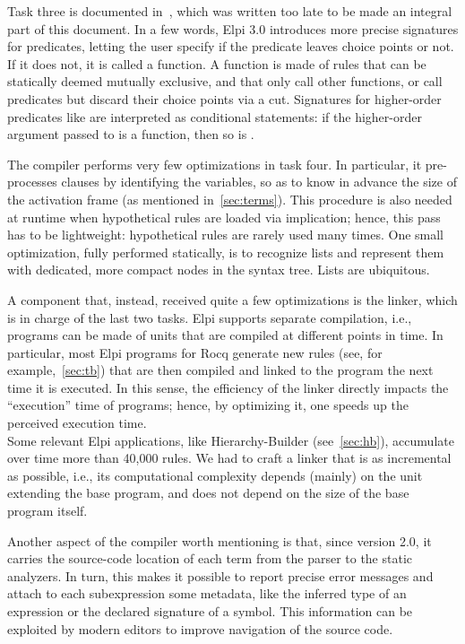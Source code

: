 \documentclass[a4paper, 11pt]{book}
\begin{document}
Task three is documented in~\cite{elpidet}, which was written too late to be
made an integral part of this document. In a few words, Elpi 3.0 introduces
more precise signatures for predicates, letting the user specify if the
predicate leaves choice points or not. If it does not, it is called a function.
A function is made of rules that can be statically deemed mutually exclusive,
and that only call other functions, or call predicates but discard their choice
points via a cut. Signatures for higher-order predicates like  are
interpreted as conditional statements: if the higher-order argument 
passed to  is a function, then so is .


The compiler performs very few optimizations in task four. In particular, it
pre-processes clauses by identifying the variables, so as to know in advance
the size of the activation frame (as mentioned in~\cref{sec:terms}). This
procedure is also needed at runtime when hypothetical rules are loaded via
implication; hence, this pass has to be lightweight: hypothetical rules are
rarely used many times. One small optimization, fully performed statically, is
to recognize lists and represent them with dedicated, more compact nodes in
the syntax tree. Lists are ubiquitous.


A component that, instead, received quite a few optimizations is the linker,
which is in charge of the last two tasks. Elpi supports separate compilation,
i.e., programs can be made of units that are compiled at different points in
time. In particular, most Elpi programs for Rocq generate new rules (see, for
example,~\cref{sec:tb}) that are then compiled and linked to the program the
next time it is executed. In this sense, the efficiency of the linker directly
impacts the ``execution'' time of programs; hence, by optimizing it, one speeds
up the perceived execution time.\\
Some relevant Elpi applications, like Hierarchy-Builder (see~\cref{sec:hb}),
accumulate over time more than 40,000 rules. We had to craft a linker that is
as incremental as possible, i.e., its computational complexity depends (mainly)
on the unit extending the base program, and does not depend on the size of the
base program itself.


Another aspect of the compiler worth mentioning is that, since version 2.0, it
carries the source-code location of each term from the parser to the static
analyzers. In turn, this makes it possible to report precise error messages and
attach to each subexpression some metadata, like the inferred type of an
expression or the declared signature of a symbol. This information can be
exploited by modern editors to improve navigation of the source code.
\end{document}
